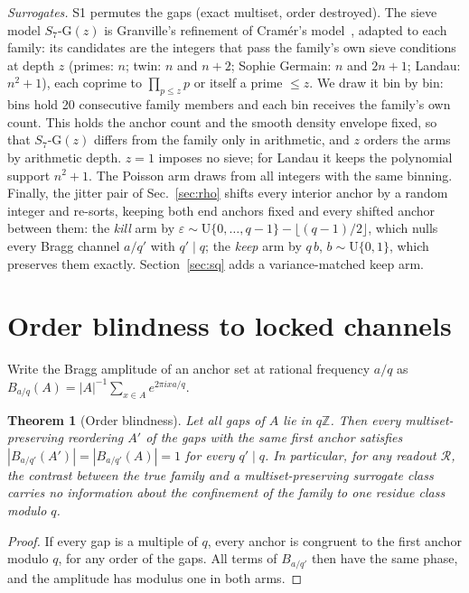 \documentclass[reprint,amsmath,amssymb,aps,pre,longbibliography]{revtex4-2}
\newtheorem{theorem}{Theorem}
\begin{document}
\emph{Surrogates.} S1 permutes the gaps (exact multiset, order destroyed). The sieve model
$S_7$-G$(z)$ is Granville's refinement of Cram\'er's model~\cite{Cramer,Granville}, adapted to
each family: its candidates are the integers that pass the family's own sieve conditions at depth
$z$ (primes: $n$; twin: $n$ and $n+2$; Sophie Germain: $n$ and $2n+1$; Landau: $n^2+1$), each
coprime to $\prod_{p\le z}p$ or itself a prime $\le z$. We draw it bin by bin: bins hold 20
consecutive family members and each bin receives the family's own count. This holds the anchor
count and the smooth density envelope fixed, so that $S_7$-G$(z)$ differs from the family only
in arithmetic, and $z$ orders the arms by arithmetic depth. $z=1$ imposes no sieve; for Landau it
keeps the polynomial support $n^2+1$. The Poisson arm draws from all integers with the same
binning. Finally, the jitter pair of Sec.~\ref{sec:rho} shifts every interior anchor by a random
integer and re-sorts, keeping both end anchors fixed and every shifted anchor between them: the
\emph{kill} arm by $\varepsilon\sim\mathrm U\{0,\dots,q-1\}-\lfloor(q-1)/2\rfloor$, which nulls
every Bragg channel $a/q'$ with $q'\mid q$; the \emph{keep} arm by $q\,b$, $b\sim\mathrm U\{0,1\}$,
which preserves them exactly. Section~\ref{sec:sq} adds a variance-matched keep arm.

\section{Order blindness to locked channels}\label{sec:theorem}

Write the Bragg amplitude of an anchor set at rational frequency $a/q$ as
$B_{a/q}(A)=|A|^{-1}\sum_{x\in A}e^{2\pi i xa/q}$.

\begin{theorem}[Order blindness]\label{thm:blind}
Let all gaps of $A$ lie in $q\mathbb Z$. Then every multiset-preserving reordering $A'$ of the gaps
with the same first anchor satisfies $|B_{a/q'}(A')|=|B_{a/q'}(A)|=1$ for every $q'\mid q$. In
particular, for any readout $\mathcal R$, the contrast between the true family and a
multiset-preserving surrogate class carries no information about the confinement of the family
to one residue class modulo $q$.
\end{theorem}
\begin{proof}
If every gap is a multiple of $q$, every anchor is congruent to the first anchor modulo $q$, for
any order of the gaps. All terms of $B_{a/q'}$ then have the same phase, and the amplitude has
modulus one in both arms.
\end{proof}
\end{document}
